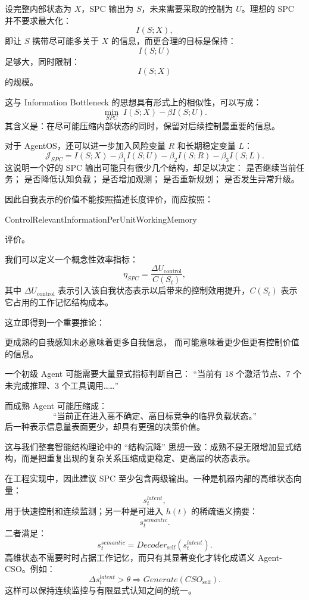 设完整内部状态为 $X$，SPC 输出为 $S$，未来需要采取的控制为 $U$。理想的 SPC 并不要求最大化：
\[
I(S;X),
\]
即让 $S$ 携带尽可能多关于 $X$ 的信息，而更合理的目标是保持：
\[
I(S;U)
\]
足够大，同时限制：
\[
I(S;X)
\]
的规模。

这与 Information Bottleneck 的思想具有形式上的相似性，可以写成：
\[
\boxed{
\min_{SPC}
\;
I(S;X)
-
\beta I(S;U).
}
\]
其含义是：在尽可能压缩内部状态的同时，保留对后续控制最重要的信息。

对于 AgentOS，还可以进一步加入风险变量 $R$ 和长期稳定变量 $L$：
\[
\mathcal J_{SPC}
=
I(S;X)
-
\beta_1 I(S;U)
-
\beta_2 I(S;R)
-
\beta_3 I(S;L).
\]
这说明一个好的 SPC 输出可能只有很少几个结构，却足以决定：
是否继续当前任务；
是否降低认知负载；
是否增加观测；
是否重新规划；
是否发生异常升级。

因此自我表示的价值不能按照描述长度评价，而应按照：
\begin{statementbox}
ControlRelevantInformationPerUnitWorkingMemory
\end{statementbox}
评价。

我们可以定义一个概念性效率指标：
\[
\eta_{SPC}
=
\frac{
\Delta U_{\mathrm{control}}
}{
C(S_t)
},
\]
其中 $\Delta U_{\mathrm{control}}$ 表示引入该自我状态表示以后带来的控制效用提升，$C(S_t)$ 表示它占用的工作记忆结构成本。

这立即得到一个重要推论：
\begin{statementbox}
更成熟的自我感知未必意味着更多自我信息，
而可能意味着更少但更有控制价值的信息。
\end{statementbox}

一个初级 Agent 可能需要大量显式指标判断自己：
``当前有 18 个激活节点、7 个未完成推理、3 个工具调用……''

而成熟 Agent 可能压缩成：
\[
\text{``当前正在进入高不确定、高目标竞争的临界负载状态。''}
\]
后一种表示信息量表面更少，却具有更强的决策价值。

这与我们整套智能结构理论中的 ``结构沉降'' 思想一致：成熟不是无限增加显式结构，而是把重复出现的复杂关系压缩成更稳定、更高层的状态表示。

在工程实现中，因此建议 SPC 至少包含两级输出。一种是机器内部的高维状态向量：
\[
s_t^{latent},
\]
用于快速控制和连续监测；另一种是可进入 $h(t)$ 的稀疏语义摘要：
\[
s_t^{semantic}.
\]
二者满足：
\[
s_t^{semantic}
=
Decoder_{\mathrm{self}}
(
s_t^{latent}
).
\]
高维状态不需要时时占据工作记忆，而只有其显著变化才转化成语义 Agent-CSO。例如：
\[
\Delta s_t^{latent}
>
\theta
\Rightarrow
Generate(
CSO_{\mathrm{self}}
).
\]
这样可以保持连续监控与有限显式认知之间的统一。

